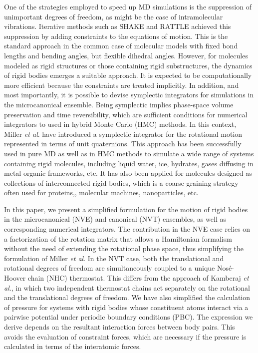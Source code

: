 \documentclass[aip,jcp,reprint,amsmath,amssymb]{revtex4-1}
\begin{document}
One of the strategies employed to speed up MD simulations is the suppression of unimportant degrees of freedom, as might be the case of intramolecular vibrations. Iterative methods such as SHAKE\cite{Ryckaert1977} and RATTLE\cite{Andersen1983} achieved this suppression by adding constraints to the equations of motion. This is the standard approach in the common case of molecular models with fixed bond lengths and bending angles, but flexible dihedral angles. However, for molecules modeled as rigid structures or those containing rigid substructures,\cite{Miller2002} the dynamics of rigid bodies emerges a suitable approach. It is expected to be computationally more efficient because the constraints are treated implicitly. In addition, and most importantly, it is possible to devise symplectic integrators for simulations in the microcanonical ensemble. Being symplectic implies phase-space volume preservation and time reversibility, which are sufficient conditions for numerical integrators to used in hybrid Monte Carlo (HMC) methods.\cite{Duane1987} In this context, Miller \textit{et al}.\cite{Miller2002} have introduced a symplectic integrator for the rotational motion represented in terms of unit quaternions. This approach has been successfully used in pure MD as well as in HMC methods to simulate a wide range of systems containing rigid molecules, including liquid water, \cite{Sakamaki2011, Reinhardt2012, Palmer2014, Gonzales2014} ice,\cite{Geiger2014} hydrates,\cite{Tribello2009, Gorman2012} gases diffusing in metal-organic frameworks,\cite{Ghoufi2010} etc. It has also been applied for molecules designed as collections of interconnected rigid bodies, which is a coarse-graining strategy often used for proteins,\cite{Terada2003}, molecular machines,\cite{Akimov2008, Konyukhov2010} nanoparticles,\cite{Knorowski2012, Patra2013} etc.

In this paper, we present a simplified formulation for the motion of rigid bodies in the microcanonical (NVE) and canonical (NVT) ensembles, as well as corresponding numerical integrators. The contribution in the NVE case relies on a factorization of the rotation matrix that allows a Hamiltonian formalism without the need of extending the rotational phase space, thus simplifying the formulation of Miller \textit{et al}.\cite{Miller2002} In the NVT case, both the translational and rotational degrees of freedom are simultaneously coupled to a unique Nos\'{e}-Hoover chain (NHC) thermostat. This differs from the approach of Kamberaj \textit{et al}.,\cite{Kamberaj2005} in which two independent thermostat chains act separately on the rotational and the translational degrees of freedom. We have also simplified the calculation of pressure for systems with rigid bodies whose constituent atoms interact via a pairwise potential under periodic boundary conditions (PBC). The expression we derive depends on the resultant interaction forces between body pairs. This avoids the evaluation of constraint forces, which are necessary if the pressure is calculated in terms of the interatomic forces.
\end{document}
